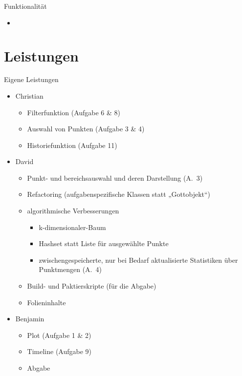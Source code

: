 \documentclass{beamer}
\begin{document}
    \begin{frame}{Funktionalität}
    	\begin{itemize}
    		\setlength\itemsep{1em}
    		\item
    	\end{itemize}
    \end{frame}

    \section{Leistungen}
    \begin{frame}{Eigene Leistungen}
    	\begin{itemize}
	    	\setlength\itemsep{1em}
	    	\item Christian
	    	\begin{itemize}
	    		\item Filterfunktion (Aufgabe 6 \& 8)
	    		\item Auswahl von Punkten (Aufgabe 3 \& 4)
	    		\item Historiefunktion (Aufgabe 11)
	    	\end{itemize}
    		\item David
    		\begin{itemize}
    			\item Punkt- und bereichsauswahl und deren Darstellung (A.\ 3)
    			\item Refactoring (aufgabenspezifische Klassen statt „Gottobjekt“)
    			\item algorithmische Verbesserungen
    				\begin{itemize}
    					\item k-dimensionaler-Baum
    					\item Hashset statt Liste für ausgewählte Punkte
    					\item zwischengespeicherte, nur bei Bedarf aktualisierte Statistiken über Punktmengen (A.\ 4)
    				\end{itemize}
    			\item Build- und Paktierskripte (für die Abgabe)
    			\item Folieninhalte
    		\end{itemize}
    		\item Benjamin
    		\begin{itemize}
    			\item Plot (Aufgabe 1 \& 2)
    			\item Timeline (Aufgabe 9)
    			\item Abgabe
    		\end{itemize}
    	\end{itemize}
    \end{frame}
\end{document}
